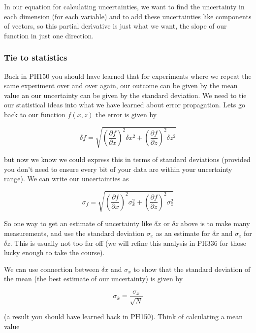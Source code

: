 In our equation for calculating uncertainties, we want to find the uncertainty in each dimension (for each variable) and to add these uncertainties like components of vectors, so this partial derivative is just what we want, the slope of our function in just one direction.

\subsubsection{Tie to statistics}

Back in PH150 you should have learned that for experiments where we repeat the same experiment over and over again, our outcome can be given by the mean value an our uncertainty can be given by the standard deviation. We need to tie our statistical ideas into what we have learned about error propagation. Lets go back to our function $f\left( x,z\right) $ the error is given by 

\begin{equation*}
	\delta f=\sqrt{\left( \frac{\partial f}{\partial x}\right) ^{2}\delta x^{2}+\left( \frac{\partial f}{\partial z}\right) ^{2}\delta z^{2}}
\end{equation*}

but now we know we could express this in terms of standard deviations (provided you don't need to ensure every bit of your data are within your uncertainty range). We can write our uncertainties as 

\begin{equation*}
	\sigma _{f}=\sqrt{\left( \frac{\partial f}{\partial x}\right) ^{2}\sigma_{x}^{2}+\left( \frac{\partial f}{\partial z}\right) ^{2}\sigma _{z}^{2}}
\end{equation*}

So one way to get an estimate of uncertainty like $\delta x$ or $\delta z$ above is to make many measurements, and use the standard deviation $\sigma_{x}$ as an estimate for $\delta x$ and $\sigma _{z}$ for $\delta z.$ This is usually not too far off (we will refine this analysis in PH336 for those lucky enough to take the course).

We can use connection between $\delta x$ and $\sigma _{x}$ to show that the standard deviation of the mean (the best estimate of our uncertainty) is given by

\begin{equation*}
	\sigma _{\bar{x}}=\frac{\sigma _{x}}{\sqrt{N}}
\end{equation*}

(a result you should have learned back in PH150). Think of calculating a mean value

